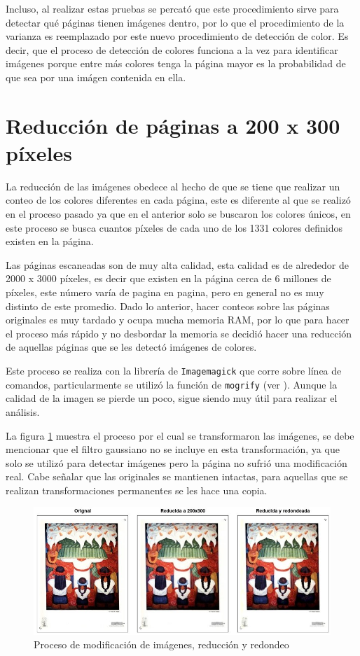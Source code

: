 Incluso, al realizar estas pruebas se percató que este procedimiento sirve para detectar qué páginas tienen imágenes dentro, por lo que el procedimiento de la varianza es reemplazado por este nuevo procedimiento de detección de color. Es decir, que el proceso de detección de colores  funciona a la vez para identificar imágenes porque entre más colores tenga la página mayor es la probabilidad de que sea por una imágen contenida en ella.

\section{Reducción de páginas a 200 x 300 píxeles}

La reducción de las imágenes obedece al hecho de que se tiene que realizar un conteo de los colores diferentes en cada página, este es diferente al que se realizó en el proceso pasado ya que en el anterior solo se buscaron los colores únicos, en este proceso se busca cuantos píxeles de cada uno de los 1331 colores definidos existen en la página. 

Las páginas escaneadas son de muy alta calidad, esta calidad es de alrededor de 2000 x 3000 píxeles, es decir que existen en la página cerca de 6 millones de píxeles, este número varía de pagina en pagina, pero en general no es muy distinto de este promedio. Dado lo anterior, hacer conteos sobre las páginas originales es muy tardado y ocupa mucha memoria RAM, por lo que para hacer el proceso más rápido y no desbordar la memoria se decidió hacer una reducción de aquellas páginas que se les detectó imágenes de colores. 

Este proceso se realiza con la librería de \texttt{Imagemagick} que corre sobre línea de comandos, particularmente se utilizó la función de  \texttt{mogrify} (ver \cite{still2005definitive}). Aunque la calidad de la imagen se pierde un poco, sigue siendo muy útil para realizar el análisis.

La figura \ref{fig:transformaciones} muestra el proceso por el cual se transformaron las imágenes, se debe mencionar que el filtro gaussiano no se incluye en esta transformación, ya que solo se utilizó para detectar imágenes pero la página no sufrió una modificación real. Cabe señalar que las originales se mantienen intactas, para aquellas que se realizan transformaciones permanentes se les hace una copia.

\begin{figure}[H]
\centering
\includegraphics[width=1\textwidth]{Figures/transformaciones.jpg}
\caption{Proceso de modificación de imágenes, reducción y redondeo}
\label{fig:transformaciones}
\end{figure}


